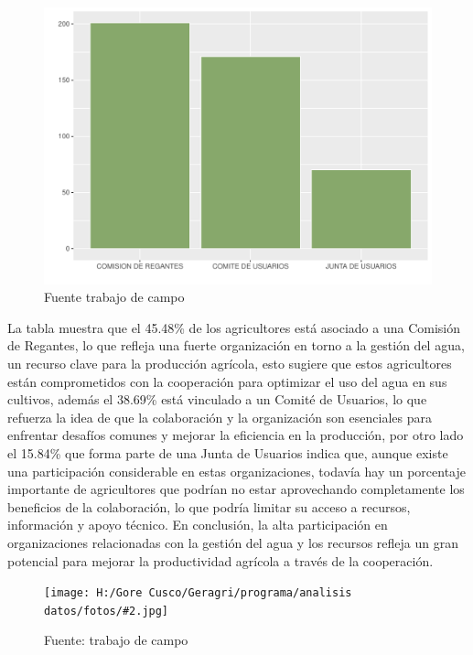 \documentclass{article}\usepackage[]{graphicx}\usepackage[table]{xcolor}
\makeatletter
\def\maxwidth{ %
  \ifdim\Gin@nat@width>\linewidth
    \linewidth
  \else
    \Gin@nat@width
  \fi
}
\newenvironment{knitrout}{}{} %
\newenvironment{fotos}[2]
{\begin{figure}[H]
	\centering
	\caption{#1}
	\texttt{[image: H:/Gore Cusco/Geragri/programa/analisis datos/fotos/\#2.jpg]}
	\caption*{Fuente: trabajo de campo}}
{\end{figure}}
\newenvironment{graficas}[2]
{\begin{figure}[H]
		\centering
		\caption{#1}
		#2
		\caption*{Fuente trabajo de campo}}
{\end{figure}}
\makeatother
\begin{document}
\begin{graficas}
{Organizacion a la que pertenece}{
\begin{knitrout}
\definecolor{shadecolor}{rgb}{0.969, 0.969, 0.969}\color{fgcolor}
\includegraphics[width=\maxwidth]{figure/fig_dieciocho-1} 
\end{knitrout}
}
\end{graficas}
La tabla muestra que el 45.48\% de los agricultores está asociado a una Comisión de Regantes, lo que refleja una fuerte organización en torno a la gestión del agua, un recurso clave para la producción agrícola, esto sugiere que estos agricultores están comprometidos con la cooperación para optimizar el uso del agua en sus cultivos, además el 38.69\% está vinculado a un Comité de Usuarios, lo que refuerza la idea de que la colaboración y la organización son esenciales para enfrentar desafíos comunes y mejorar la eficiencia en la producción, por otro lado el 15.84\% que forma parte de una Junta de Usuarios indica que, aunque existe una participación considerable en estas organizaciones, todavía hay un porcentaje importante de agricultores que podrían no estar aprovechando completamente los beneficios de la colaboración, lo que podría limitar su acceso a recursos, información y apoyo técnico. En conclusión, la alta participación en organizaciones relacionadas con la gestión del agua y los recursos refleja un gran potencial para mejorar la productividad agrícola a través de la cooperación.
\begin{fotos}
{reconocimiento en campo}{16}
\end{fotos}
\end{document}

